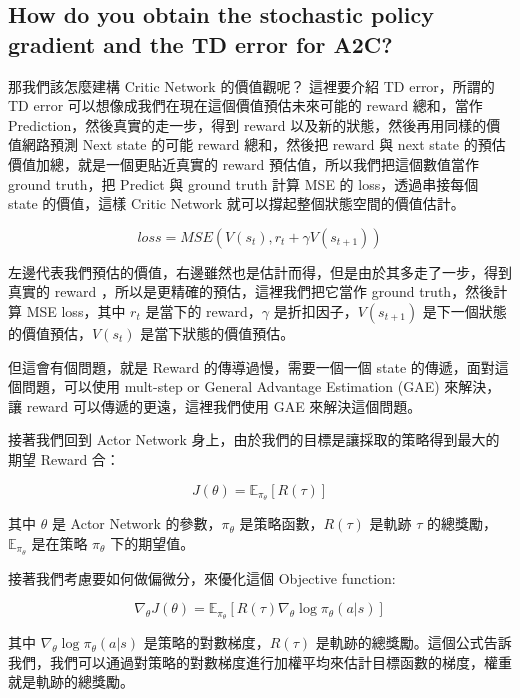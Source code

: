 \clearpage

\subsection{How do you obtain the stochastic policy gradient and the TD error for A2C?}

那我們該怎麼建構 Critic Network 的價值觀呢？ 這裡要介紹 TD error，所謂的 TD error 可以想像成我們在現在這個價值預估未來可能的 reward 總和，當作 Prediction，然後真實的走一步，得到 reward 以及新的狀態，然後再用同樣的價值網路預測 Next state 的可能 reward 總和，然後把 reward 與 next state 的預估價值加總，就是一個更貼近真實的 reward 預估值，所以我們把這個數值當作 ground truth，把 Predict 與 ground truth 計算 MSE 的 loss，透過串接每個 state 的價值，這樣 Critic Network 就可以撐起整個狀態空間的價值估計。


\begin{equation}
    loss = MSE(V(s_t), r_t + \gamma V(s_{t+1}))
\end{equation}

左邊代表我們預估的價值，右邊雖然也是估計而得，但是由於其多走了一步，得到真實的 reward ，所以是更精確的預估，這裡我們把它當作 ground truth，然後計算 MSE loss，其中 $r_t$ 是當下的 reward，$\gamma$ 是折扣因子，$V(s_{t+1})$ 是下一個狀態的價值預估，$V(s_t)$ 是當下狀態的價值預估。


但這會有個問題，就是 Reward 的傳導過慢，需要一個一個 state 的傳遞，面對這個問題，可以使用 mult-step or General Advantage Estimation (GAE) 來解決，讓 reward 可以傳遞的更遠，這裡我們使用 GAE 來解決這個問題。

接著我們回到 Actor Network 身上，由於我們的目標是讓採取的策略得到最大的期望 Reward 合：

\begin{equation}
    J(\theta) = \mathbb{E}_{\pi_\theta}[R(\tau)]
\end{equation}

其中 $\theta$ 是 Actor Network 的參數，$\pi_\theta$ 是策略函數，$R(\tau)$ 是軌跡 $\tau$ 的總獎勵，$\mathbb{E}_{\pi_\theta}$ 是在策略 $\pi_\theta$ 下的期望值。

接著我們考慮要如何做偏微分，來優化這個 Objective function:

\begin{equation}
    \nabla_\theta J(\theta) = \mathbb{E}_{\pi_\theta}[R(\tau) \nabla_\theta \log \pi_\theta(a|s) ]
\end{equation}

其中 $\nabla_\theta \log \pi_\theta(a|s)$ 是策略的對數梯度，$R(\tau)$ 是軌跡的總獎勵。這個公式告訴我們，我們可以通過對策略的對數梯度進行加權平均來估計目標函數的梯度，權重就是軌跡的總獎勵。

